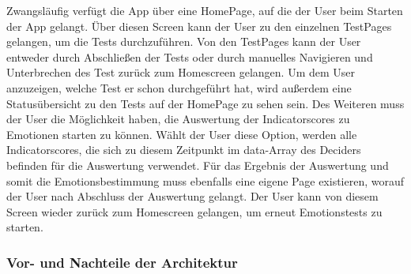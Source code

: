 Zwangsläufig verfügt die App über eine HomePage, auf die der User beim Starten der App gelangt. Über diesen Screen kann der User zu den einzelnen TestPages gelangen, um die Tests durchzuführen. Von den TestPages kann der User entweder durch Abschließen der Tests oder durch manuelles Navigieren und Unterbrechen des Test zurück zum Homescreen gelangen. Um dem User anzuzeigen, welche Test er schon durchgeführt hat, wird außerdem eine Statusübersicht zu den Tests auf der HomePage zu sehen sein. Des Weiteren muss der User die Möglichkeit haben, die Auswertung der Indicatorscores zu Emotionen starten zu können. Wählt der User diese Option, werden alle Indicatorscores, die sich zu diesem Zeitpunkt im data-Array des Deciders befinden für die Auswertung verwendet. \newline
Für das Ergebnis der Auswertung und somit die Emotionsbestimmung muss ebenfalls eine eigene Page existieren, worauf der User nach Abschluss der Auswertung gelangt. Der User kann von diesem Screen wieder zurück zum Homescreen gelangen, um erneut Emotionstests zu starten. 
\subsubsection{Vor- und Nachteile der Architektur} 